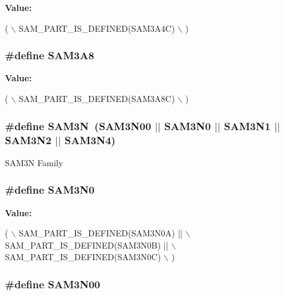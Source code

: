 {\bfseries Value\-:}
\begin{DoxyCode}
( \(\backslash\)
                SAM\_PART\_IS\_DEFINED(SAM3A4C) \(\backslash\)
                )
\end{DoxyCode}
\hypertarget{group__sam__part__macros__group_gab1397a5e346af96e5ed34027ed3b4de8}{
\subsubsection[{S\-A\-M3\-A8}]{\setlength{\rightskip}{0pt plus 5cm}\#define S\-A\-M3\-A8}}\label{group__sam__part__macros__group_gab1397a5e346af96e5ed34027ed3b4de8}
{\bfseries Value\-:}
\begin{DoxyCode}
( \(\backslash\)
                SAM\_PART\_IS\_DEFINED(SAM3A8C) \(\backslash\)
                )
\end{DoxyCode}
\hypertarget{group__sam__part__macros__group_ga52239420b96aa3f1a273665cfd3b60a1}{
\subsubsection[{S\-A\-M3\-N}]{\setlength{\rightskip}{0pt plus 5cm}\#define S\-A\-M3\-N~(S\-A\-M3\-N00 $|$$|$ S\-A\-M3\-N0 $|$$|$ S\-A\-M3\-N1 $|$$|$ S\-A\-M3\-N2 $|$$|$ S\-A\-M3\-N4)}}\label{group__sam__part__macros__group_ga52239420b96aa3f1a273665cfd3b60a1}
S\-A\-M3\-N Family \hypertarget{group__sam__part__macros__group_ga6a5ed34ed428558ee2bb94af5ae516d6}{
\subsubsection[{S\-A\-M3\-N0}]{\setlength{\rightskip}{0pt plus 5cm}\#define S\-A\-M3\-N0}}\label{group__sam__part__macros__group_ga6a5ed34ed428558ee2bb94af5ae516d6}
{\bfseries Value\-:}
\begin{DoxyCode}
( \(\backslash\)
                SAM\_PART\_IS\_DEFINED(SAM3N0A) || \(\backslash\)
                SAM\_PART\_IS\_DEFINED(SAM3N0B) || \(\backslash\)
                SAM\_PART\_IS\_DEFINED(SAM3N0C) \(\backslash\)
                )
\end{DoxyCode}
\hypertarget{group__sam__part__macros__group_gab650d285e2a8ff0d85b3522c87a4cfc6}{
\subsubsection[{S\-A\-M3\-N00}]{\setlength{\rightskip}{0pt plus 5cm}\#define S\-A\-M3\-N00}}\label{group__sam__part__macros__group_gab650d285e2a8ff0d85b3522c87a4cfc6}
